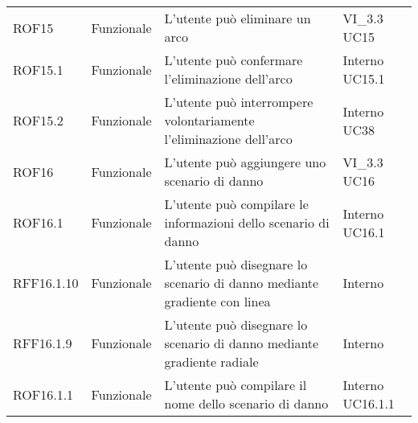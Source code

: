 \begin{longtable}{p{2cm}!{\VRule[1pt]}p{2cm}!{\VRule[1pt]}p{5cm}!{\VRule[1pt]}p{1.5cm}}
	\\
	ROF15                            & Funzionale\newline               & L'utente può eliminare un arco                                                                                           & VI_3.3 \newline UC15         
	\\
	ROF15.1                          & Funzionale\newline               & L'utente può confermare l'eliminazione dell'arco                                                                         & Interno \newline UC15.1      
	\\
	ROF15.2                          & Funzionale\newline               & L'utente può interrompere volontariamente l'eliminazione dell'arco                                                       & Interno \newline UC38        
	\\
	ROF16                            & Funzionale\newline               & L'utente può aggiungere uno scenario di danno                                                                            & VI_3.3 \newline UC16         
	\\
	ROF16.1                          & Funzionale\newline               & L'utente può compilare le informazioni dello scenario di danno                                                           & Interno \newline UC16.1      
	\\
	RFF16.1.10                       & Funzionale\newline               & L'utente può disegnare lo scenario di danno mediante gradiente con linea                                                 & Interno                      \\
	RFF16.1.9                        & Funzionale\newline               & L'utente può disegnare lo scenario di danno mediante gradiente radiale                                                   & Interno                      \\
	ROF16.1.1                        & Funzionale\newline               & L'utente può compilare il nome dello scenario di danno                                                                   & Interno \newline UC16.1.1    

\end{longtable}
